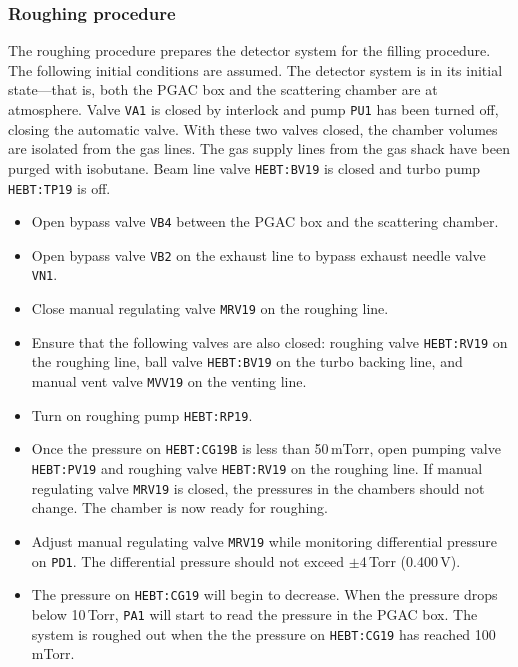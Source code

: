 \subsubsection{Roughing procedure}
The roughing procedure prepares the detector system for the filling procedure.
The following initial conditions are assumed.  The detector system is in its initial state---that is, both the PGAC box and the scattering chamber are at atmosphere. Valve \texttt{VA1} is closed by interlock and pump \texttt{PU1} has been turned off, closing the automatic valve.  With these two valves closed, the chamber volumes are isolated from the gas lines.  The gas supply lines from the gas shack have been purged with isobutane.  Beam line valve  \texttt{HEBT:BV19} is closed and turbo pump  \texttt{HEBT:TP19} is off. 
\begin{itemize}
\setlength{\itemsep}{0pt}
\setlength{\parskip}{0pt}
\item Open bypass valve \texttt{VB4} between the PGAC box and the scattering chamber.
\item Open bypass valve \texttt{VB2} on the exhaust line to bypass exhaust needle valve \texttt{VN1}.
\item Close manual regulating valve \texttt{MRV19} on the roughing line.
\item Ensure that the following valves are also closed: roughing valve \texttt{HEBT:RV19} on the roughing line, ball valve \texttt{HEBT:BV19} on the turbo backing line, and manual vent valve \texttt{MVV19} on the venting line.
\item Turn on roughing pump \texttt{HEBT:RP19}.
\item Once the pressure on \texttt{HEBT:CG19B} is less than 50\,mTorr, open pumping valve \texttt{HEBT:PV19} and roughing valve \texttt{HEBT:RV19} on the roughing line. If manual regulating valve \texttt{MRV19} is closed, the pressures in the chambers should not change. The chamber is now ready for roughing.
\item Adjust manual regulating valve \texttt{MRV19}  while monitoring differential pressure on \texttt{PD1}.  The differential pressure should not exceed $\pm$4\,Torr (0.400\,V).
\item The pressure on \texttt{HEBT:CG19} will begin to decrease. When the pressure drops below 10\,Torr, \texttt{PA1} will start to read the pressure in the PGAC box. The system is roughed out %
 when the the pressure on \texttt{HEBT:CG19} has reached 100\,mTorr.%
\end{itemize}

